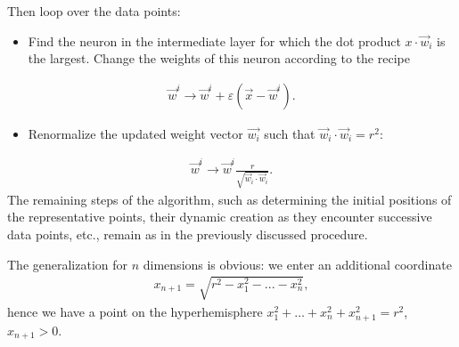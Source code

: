 \documentclass[letterpaper,10pt,english]{jupyterBook}
\begin{document}
\sphinxAtStartPar
Then loop over the data points:
\begin{itemize}
\item {} 
\sphinxAtStartPar
Find the neuron in the intermediate layer for which the dot product \( x \cdot \vec {w} _i \) is the largest. Change the weights of this neuron according to the recipe

\end{itemize}
\begin{equation*}
\begin{split} \vec {w} ^ i \to \vec {w} ^ i + \varepsilon (\vec {x} - \vec {w} ^ i). \end{split}
\end{equation*}\begin{itemize}
\item {} 
\sphinxAtStartPar
Renormalize the updated weight vector \( \vec {w_i} \) such that \( \vec {w} _i \cdot \vec {w} _i = r ^ 2 \):

\end{itemize}
\begin{equation*}
\begin{split} \vec {w} ^ i \to \vec {w} ^ i \frac {r} {\sqrt {\vec {w} _i \cdot \vec {w} _i}}. \end{split}
\end{equation*}
\sphinxAtStartPar
The remaining steps of the algorithm, such as determining the initial positions of the representative points, their dynamic creation as they encounter successive data points, etc., remain as in the previously discussed procedure.

\sphinxAtStartPar
The generalization for \( n \) dimensions is obvious: we enter an additional coordinate
\begin{equation*}
\begin{split} x_ {n + 1} = \sqrt {r ^ 2 - x_1 ^ 2 -...- x_n ^ 2},\end{split}
\end{equation*}
\sphinxAtStartPar
hence we have a point on the hyper\sphinxhyphen{}hemisphere \( x_1 ^ 2 + \dots + x_n ^ 2 + x_ {n + 1} ^ 2 = r ^ 2 \),  \(x_ {n + 1} >0\).
\end{document}
